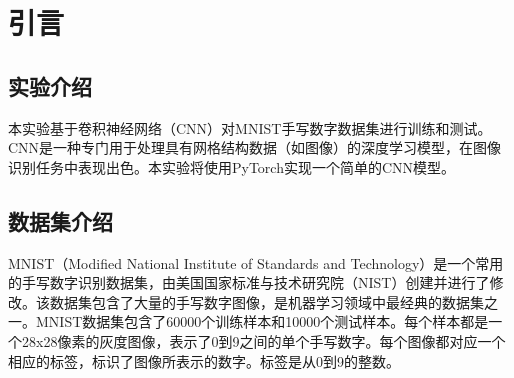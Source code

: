 \section{引言}\label{sec:introduction}

\subsection{实验介绍}

本实验基于卷积神经网络（CNN）对MNIST手写数字数据集进行训练和测试。CNN是一种专门用于处理具有网格结构数据（如图像）的深度学习模型，在图像识别任务中表现出色。本实验将使用PyTorch实现一个简单的CNN模型。

\subsection{数据集介绍}

MNIST（Modified National Institute of Standards and Technology）是一个常用的手写数字识别数据集，由美国国家标准与技术研究院（NIST）创建并进行了修改。该数据集包含了大量的手写数字图像，是机器学习领域中最经典的数据集之一。MNIST数据集包含了60000个训练样本和10000个测试样本。每个样本都是一个28x28像素的灰度图像，表示了0到9之间的单个手写数字。每个图像都对应一个相应的标签，标识了图像所表示的数字。标签是从0到9的整数。